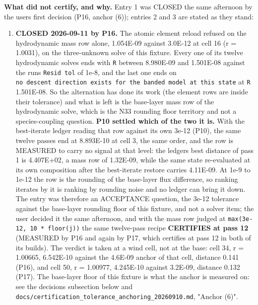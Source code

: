 \documentclass[english,a4paper]{my_memo}
\providecommand{\tightlist}{\setlength{\itemsep}{0pt}\setlength{\parskip}{0pt}}
\begin{document}
\textbf{What did not certify, and why.} Entry 1 was CLOSED the same afternoon by
the user\textquotesingle s first decision (P16, anchor (6)); entries 2 and 3 are stated as
they stand:

\begin{enumerate}
\def\labelenumi{\arabic{enumi}.}
\tightlist
\item
  \textbf{CLOSED 2026-09-11 by P16.} The atomic element reload refused on the
  hydrodynamic mass row alone,
  1.054E-09 against 3.0E-12 at cell 16 (r = 1.0031), on the three-unknown
  solve of this fixture. Every one of its twelve hydrodynamic solves ends
  with \texttt{\textbar{}\textbar{}R\textbar{}\textbar{}} between 8.980E-09 and 1.501E-08 against the run\textquotesingle s \texttt{Resid\ tol}
  of 1e-8, and the last one ends on \texttt{no\ descent\ direction\ exists\ for\ the\ banded\ model\ at\ this\ state} at \texttt{\textbar{}\textbar{}R\textbar{}\textbar{}} 1.501E-08. So the alternation has
  done its work (the element rows are inside their tolerance) and what is
  left is the base-layer mass row of the hydrodynamic solve, which is the
  N33 rounding floor territory and not a species-coupling question.
  \textbf{P10 settled which of the two it is.} With the best-iterate ledger
  reading that row against its own 3e-12 (P10), the same twelve passes end at
  8.893E-10 at cell 3, the same order, and the row is MEASURED to carry no
  signal at that level: the ledger\textquotesingle s best distance of pass 1 is 4.407E+02, a
  mass row of 1.32E-09, while the same state re-evaluated at its own
  composition after the best-iterate restore carries 4.11E-09. At 1e-9 to
  1e-12 the row is the rounding of the base-layer flux difference, so ranking
  iterates by it is ranking by rounding noise and no ledger can bring it
  down. The entry was therefore an ACCEPTANCE question, the 3e-12 tolerance
  against the base-layer rounding floor of this fixture, and not a solver
  item; the user decided it the same afternoon, and with the mass row judged
  at \texttt{max(3e-12,\ 10\ *\ floor(j))} the same twelve-pass recipe \textbf{CERTIFIES at
  pass 12} (MEASURED by P16 and again by P17, which certifies at pass 12 in
  both of its builds). The verdict is taken at a wind cell, not at the base:
  cell 34, r = 1.00665, 6.542E-10 against the 4.6E-09 anchor of that cell,
  distance 0.141 (P16), and cell 50, r = 1.00977, 4.245E-10 against 3.2E-09,
  distance 0.132 (P17). The base-layer floor of this fixture is what the
  anchor is measured on: see the decisions subsection below and
  \texttt{docs/certification\_tolerance\_anchoring\_20260910.md}, "Anchor (6)".

\end{enumerate}
\end{document}
